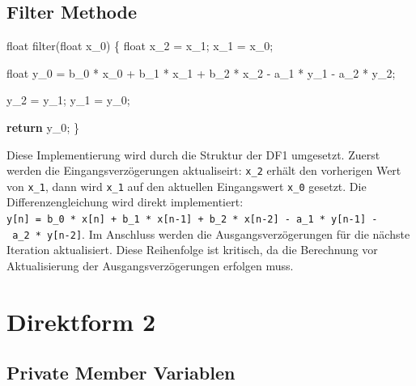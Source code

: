 \documentclass[
  ngerman,
  letterpaper,
  DIV=11]{scrreprt}
\newenvironment{Shaded}{\begin{snugshade}}{\end{snugshade}}
\newcommand{\ControlFlowTok}[1]{\textcolor[rgb]{0.00,0.23,0.31}{\textbf{#1}}}
\newcommand{\DataTypeTok}[1]{\textcolor[rgb]{0.68,0.00,0.00}{#1}}
\newcommand{\NormalTok}[1]{\textcolor[rgb]{0.00,0.23,0.31}{#1}}
\newcommand{\OperatorTok}[1]{\textcolor[rgb]{0.37,0.37,0.37}{#1}}
\begin{document}
\subsection{Filter Methode}\label{filter-methode}

\begin{Shaded}
\begin{Highlighting}[]
\DataTypeTok{float}\NormalTok{ filter}\OperatorTok{(}\DataTypeTok{float}\NormalTok{ x\_0}\OperatorTok{)}
\OperatorTok{\{}
  \DataTypeTok{float}\NormalTok{ x\_2 }\OperatorTok{=}\NormalTok{ x\_1}\OperatorTok{;}
\NormalTok{  x\_1 }\OperatorTok{=}\NormalTok{ x\_0}\OperatorTok{;}
    
  \DataTypeTok{float}\NormalTok{ y\_0 }\OperatorTok{=}\NormalTok{ b\_0 }\OperatorTok{*}\NormalTok{ x\_0 }\OperatorTok{+}\NormalTok{ b\_1 }\OperatorTok{*}\NormalTok{ x\_1 }\OperatorTok{+}\NormalTok{ b\_2 }\OperatorTok{*}\NormalTok{ x\_2 }\OperatorTok{{-}}\NormalTok{ a\_1 }\OperatorTok{*}\NormalTok{ y\_1 }\OperatorTok{{-}}\NormalTok{ a\_2 }\OperatorTok{*}\NormalTok{ y\_2}\OperatorTok{;}
    
\NormalTok{  y\_2 }\OperatorTok{=}\NormalTok{ y\_1}\OperatorTok{;}
\NormalTok{  y\_1 }\OperatorTok{=}\NormalTok{ y\_0}\OperatorTok{;}

  \ControlFlowTok{return}\NormalTok{ y\_0}\OperatorTok{;}
\OperatorTok{\}}  
\end{Highlighting}
\end{Shaded}

Diese Implementierung wird durch die Struktur der DF1 umgesetzt. Zuerst
werden die Eingangsverzögerungen aktualiseirt: \texttt{x\_2} erhält den
vorherigen Wert von \texttt{x\_1}, dann wird \texttt{x\_1} auf den
aktuellen Eingangswert \texttt{x\_0} gesetzt. Die Differenzengleichung
wird direkt implementiert:
\texttt{y{[}n{]}\ =\ b\_0\ *\ x{[}n{]}\ +\ b\_1\ *\ x{[}n-1{]}\ +\ b\_2\ *\ x{[}n-2{]}\ -\ a\_1\ *\ y{[}n-1{]}\ -\ a\_2\ *\ y{[}n-2{]}}.
Im Anschluss werden die Ausgangsverzögerungen für die nächste Iteration
aktualisiert. Diese Reihenfolge ist kritisch, da die Berechnung vor
Aktualisierung der Ausgangsverzögerungen erfolgen muss.

\section{Direktform 2}\label{direktform-2}

\subsection{Private Member Variablen}\label{private-member-variablen-1}
\end{document}
